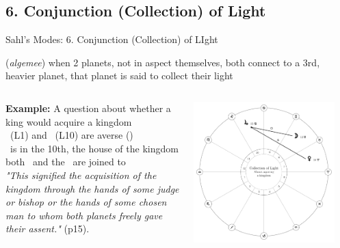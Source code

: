 \subsection{6. Conjunction (Collection) of Light}
\begin{frame}[t]{Sahl's Modes: 6. Conjunction (Collection) of LIght}
\begin{description}[style=nextline]
\item[6. Collection of Light] (\textsl{algemee}) when 2 planets, not in aspect themselves, both connect to a 3rd, heavier planet, that planet is said to collect their light

\begin{columns}[T, onlytextwidth]
\textbf{Example:} A question about whether a king would acquire a kingdom \\
\ul
\Venus\ (L1) and \Moon\ (L10) are averse (\Semisextile) \\
\Jupiter\ is in the 10th, the house of the kingdom \\
both \Venus\ and the \Moon\ are joined to \Jupiter \\
\vspace{0.25cm}
\textsl{"This signified the acquisition of the kingdom through the hands of some judge or bishop or the hands of some chosen man to whom both planets freely gave their assent."} (p15). \\
\vspace{0.25cm}

\vspace{-0.5cm}
\begin{center}
{\includegraphics[width=0.9\textwidth]{charts/61-collection}} \\
\end{center}
\end{columns}
\end{description}
\end{frame}
